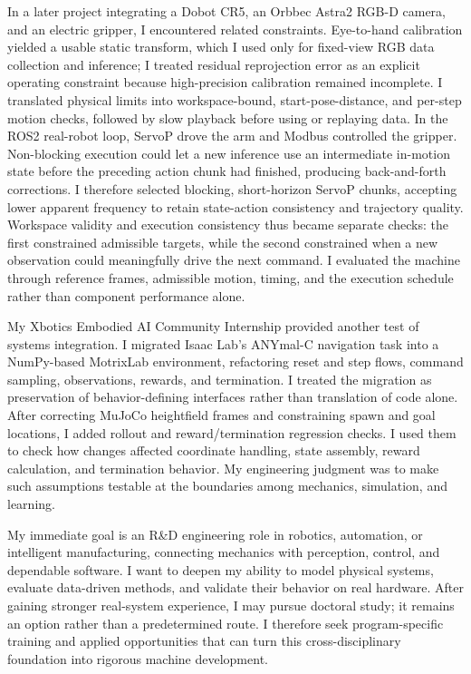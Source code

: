 In a later project integrating a Dobot CR5, an Orbbec Astra2 RGB-D camera, and an electric gripper, I encountered related constraints. Eye-to-hand calibration yielded a usable static transform, which I used only for fixed-view RGB data collection and inference; I treated residual reprojection error as an explicit operating constraint because high-precision calibration remained incomplete. I translated physical limits into workspace-bound, start-pose-distance, and per-step motion checks, followed by slow playback before using or replaying data. In the ROS2 real-robot loop, ServoP drove the arm and Modbus controlled the gripper. Non-blocking execution could let a new inference use an intermediate in-motion state before the preceding action chunk had finished, producing back-and-forth corrections. I therefore selected blocking, short-horizon ServoP chunks, accepting lower apparent frequency to retain state-action consistency and trajectory quality. Workspace validity and execution consistency thus became separate checks: the first constrained admissible targets, while the second constrained when a new observation could meaningfully drive the next command. I evaluated the machine through reference frames, admissible motion, timing, and the execution schedule rather than component performance alone.

My Xbotics Embodied AI Community Internship provided another test of systems integration. I migrated Isaac Lab's ANYmal-C navigation task into a NumPy-based MotrixLab environment, refactoring reset and step flows, command sampling, observations, rewards, and termination. I treated the migration as preservation of behavior-defining interfaces rather than translation of code alone. After correcting MuJoCo heightfield frames and constraining spawn and goal locations, I added rollout and reward/termination regression checks. I used them to check how changes affected coordinate handling, state assembly, reward calculation, and termination behavior. My engineering judgment was to make such assumptions testable at the boundaries among mechanics, simulation, and learning.

My immediate goal is an R\&D engineering role in robotics, automation, or intelligent manufacturing, connecting mechanics with perception, control, and dependable software. I want to deepen my ability to model physical systems, evaluate data-driven methods, and validate their behavior on real hardware. After gaining stronger real-system experience, I may pursue doctoral study; it remains an option rather than a predetermined route. I therefore seek program-specific training and applied opportunities that can turn this cross-disciplinary foundation into rigorous machine development.
